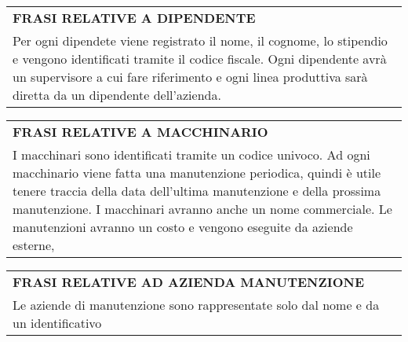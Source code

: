 \begin{center}
	\begin{tabular}{P{16cm}}
		\toprule
		 \textbf {\large {FRASI RELATIVE A DIPENDENTE}} \\
		Per ogni dipendete viene registrato il nome, il cognome, lo stipendio e vengono identificati tramite il codice fiscale. Ogni dipendente avrà un supervisore a cui fare riferimento e ogni linea produttiva sarà diretta da un dipendente dell'azienda.\\
		\bottomrule
	\end{tabular}
	
	\vspace{0.5cm}
	
	\begin{tabular}{P{16cm}}
		\toprule
		 \textbf {\large {FRASI RELATIVE A MACCHINARIO}} \\
		I macchinari sono identificati tramite un codice univoco. Ad ogni macchinario viene fatta una manutenzione periodica, quindi è utile tenere traccia della data dell'ultima manutenzione e della prossima manutenzione. I macchinari avranno anche un nome commerciale. Le manutenzioni avranno un costo e vengono eseguite da aziende esterne,\\
		\bottomrule
	\end{tabular}
	
	\vspace{0.5cm}
	
	\begin{tabular}{P{16cm}}
		\toprule
		 \textbf {\large {FRASI RELATIVE AD AZIENDA MANUTENZIONE}} \\
		Le aziende di manutenzione sono rappresentate solo dal nome e da un identificativo\\
		\bottomrule
	\end{tabular}
\end{center}